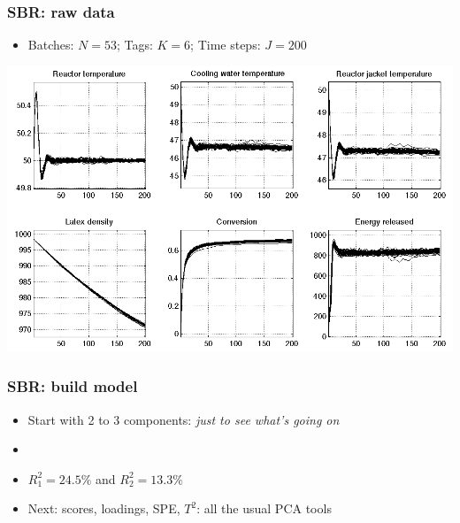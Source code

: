 \begin{frame}\frametitle{SBR: raw data}
	
	\begin{itemize}
		\item	Batches: \( N = 53 \); Tags: \( K = 6 \); Time steps: \( J = 200 \)
		
	\end{itemize}
	
	\begin{center}
		\includegraphics[width=\textwidth]{images/sbr/SBR-raw-data-trajectories.png}
	\end{center}
	{}
\end{frame}

\begin{frame}\frametitle{SBR: build model}
	
	\begin{itemize}
		\item	Start with 2 to 3 components: \emph{just to see what's going on}
		
		\item	{}
		
		\item	\( R^2_1 = 24.5\% \) and \( R^2_2 = 13.3\% \)

		
		\item	Next: scores, loadings, SPE, \( T^2 \): all the usual PCA tools
		
	\end{itemize}

\end{frame}

